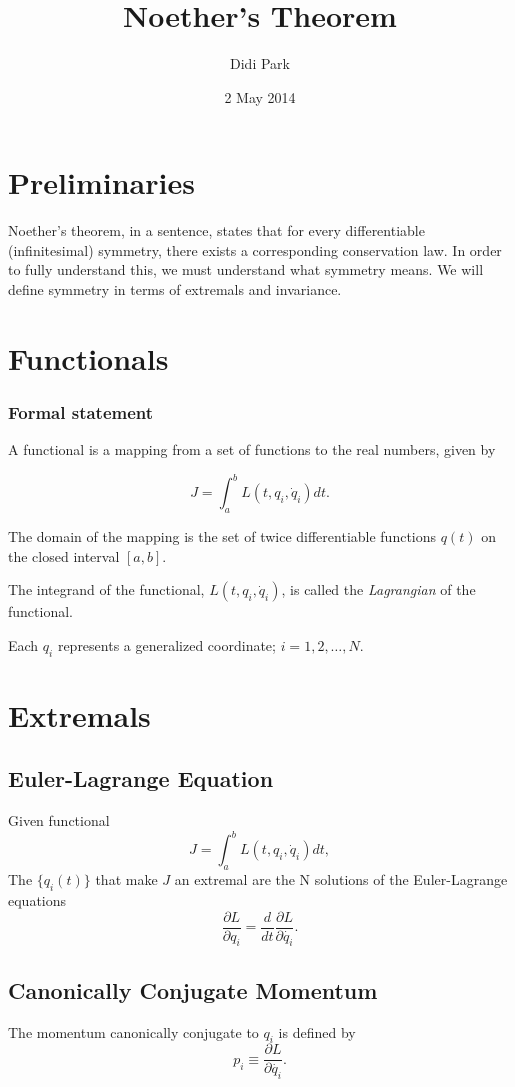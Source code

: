 \documentclass[11pt]{article}
\title{Noether's Theorem}
\author{Didi Park}
\date{2 May 2014}
\begin{document}
\maketitle

\section{Preliminaries}
Noether's theorem, in a sentence, states that for every differentiable (infinitesimal) symmetry, there exists a corresponding conservation law. In order to fully understand this, we must understand what symmetry means. We will define symmetry in terms of extremals and invariance. 

\section{Functionals}
\subsubsection{Formal statement}
A functional is a mapping from a set of functions to the real numbers, given by

$$J = \int_a^b L(t,q_i,\dot{q}_i)dt.$$

The domain of the mapping is the set of twice differentiable functions ${q(t)}$ on the closed interval $[a,b]$.

The integrand of the functional, $L(t,q_i,\dot{q}_i)$, is called the \emph{Lagrangian} of the functional.

Each $q_i$ represents a generalized coordinate; $i=1,2,\dots,N$.

\section{Extremals}
\subsection{Euler-Lagrange Equation}
Given functional
$$J = \int_a^b L(t,q_i,\dot{q}_i)dt,$$
The $\{q_i(t)\}$ that make $J$ an extremal are the N solutions of the Euler-Lagrange equations
$$\frac{\partial L}{\partial q_i}=\frac{d}{dt} \frac{\partial L}{\partial \dot{q_i}}.$$

\subsection{Canonically Conjugate Momentum}
The momentum canonically conjugate to $q_i$ is defined by 
$$p_i \equiv \frac{\partial L}{\partial \dot{q_i}}.$$
\end{document}
